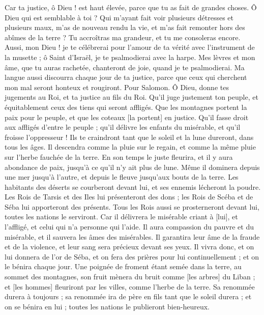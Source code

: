 \begin{multicols}{2}
Car ta justice, ô Dieu ! est haut élevée, parce que tu as fait de grandes choses. Ô Dieu qui est semblable à toi ?
Qui m'ayant fait voir plusieurs détresses et plusieurs maux, m'as de nouveau rendu la vie, et m'as fait remonter hors des abîmes de la terre ?
Tu accroîtras ma grandeur, et tu me consoleras encore.
Aussi, mon Dieu ! je te célébrerai pour l'amour de ta vérité avec l'instrument de la musette ; ô Saint d'Israël, je te psalmodierai avec la harpe.
Mes lèvres et mon âme, que tu auras rachetée, chanteront de joie, quand je te psalmodierai.
Ma langue aussi discourra chaque jour de ta justice, parce que ceux qui cherchent mon mal seront honteux et rougiront.
\VerseOne{}Pour Salomon. Ô Dieu, donne tes jugements au Roi, et ta justice au fils du Roi.
Qu'il juge justement ton peuple, et équitablement ceux des tiens qui seront affligés.
Que les montagnes portent la paix pour le peuple, et que les coteaux [la portent] en justice.
Qu'il fasse droit aux affligés d'entre le peuple ; qu'il délivre les enfants du misérable, et qu'il froisse l'oppresseur !
Ils te craindront tant que le soleil et la lune dureront, dans tous les âges.
Il descendra comme la pluie sur le regain, et comme la même pluie sur l'herbe fauchée de la terre.
En son temps le juste fleurira, et il y aura abondance de paix, jusqu'à ce qu'il n'y ait plus de lune.
Même il dominera depuis une mer jusqu'à l'autre, et depuis le fleuve jusqu'aux bouts de la terre.
Les habitants des déserts se courberont devant lui, et ses ennemis lécheront la poudre.
Les Rois de Tarsis et des Iles lui présenteront des dons ; les Rois de Scéba et de Séba lui apporteront des présents.
Tous les Rois aussi se prosterneront devant lui, toutes les nations le serviront.
Car il délivrera le misérable criant à [lui], et l'affligé, et celui qui n'a personne qui l'aide.
Il aura compassion du pauvre et du misérable, et il sauvera les âmes des misérables.
Il garantira leur âme de la fraude et de la violence, et leur sang sera précieux devant ses yeux.
Il vivra donc, et on lui donnera de l'or de Séba, et on fera des prières pour lui continuellement ; et on le bénira chaque jour.
Une poignée de froment étant semée dans la terre, au sommet des montagnes, son fruit mènera du bruit comme [les arbres] du Liban ; et [les hommes] fleuriront par les villes, comme l'herbe de la terre.
Sa renommée durera à toujours ; sa renommée ira de père en fils tant que le soleil durera ; et on se bénira en lui ; toutes les nations le publieront bien-heureux.

\end{multicols}
